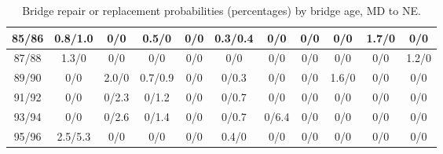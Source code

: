 \begin{table*}[htb]
\begin{tabular}{|c| c c c c c c c c c c |}
85/86&0.8/1.0& 0/0& 0.5/0& 0/0& 0.3/0.4& 0/0& 0/0& 0/0& 1.7/0& 0/0\\\hline
87/88&1.3/0& 0/0& 0/0& 0/0& 0/0& 0/0& 0/0& 0/0& 0/0& 1.2/0\\\hline
89/90&0/0& 2.0/0& 0.7/0.9& 0/0& 0/0.3& 0/0& 0/0& 1.6/0& 0/0& 0/0\\\hline
91/92&0/0& 0/2.3& 0/1.2& 0/0& 0/0.7& 0/0& 0/0& 0/0& 0/0& 0/0\\\hline
93/94&0/0& 0/2.6& 0/1.4& 0/0& 0/0.7& 0/6.4& 0/0& 0/0& 0/0& 0/0\\\hline
95/96&2.5/5.3& 0/0& 0/0& 0/0& 0.4/0& 0/0& 0/0& 0/0& 0/0& 0/0\\\hline

    \end{tabular}
    \caption{Bridge repair or replacement probabilities (percentages) by bridge age, MD to NE.}
    \label{table:states2}
\end{table*}
    

